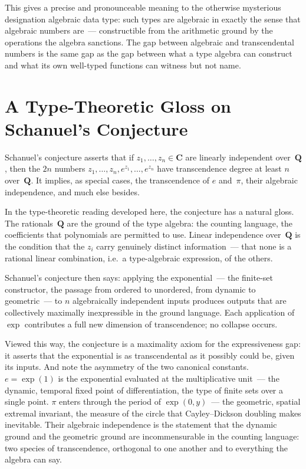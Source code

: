 This gives a precise and pronounceable meaning to the otherwise mysterious
designation {\itfont algebraic data type\/}: such types are algebraic in exactly
the sense that algebraic numbers are~--- constructible from the arithmetic ground
by the operations the algebra sanctions. The gap between algebraic and
transcendental numbers is the same gap as the gap between what a type algebra can
construct and what its own well-typed functions can witness but not name.

\section{A Type-Theoretic Gloss on Schanuel's Conjecture}

Schanuel's conjecture asserts that if $z_1, \ldots, z_n \in \mathbf{C}$ are
linearly independent over~$\mathbf{Q}$, then the $2n$ numbers
$z_1, \ldots, z_n, e^{z_1}, \ldots, e^{z_n}$ have transcendence degree at least
$n$ over~$\mathbf{Q}$. It implies, as special cases, the transcendence of $e$
and~$\pi$, their algebraic independence, and much else besides.

In the type-theoretic reading developed here, the conjecture has a natural gloss.
The rationals~$\mathbf{Q}$ are the ground of the type algebra: the counting
language, the coefficients that polynomials are permitted to use. Linear
independence over~$\mathbf{Q}$ is the condition that the $z_i$ carry genuinely
distinct information~--- that none is a rational linear combination, i.e.\ a
{\itfont type-algebraic expression\/}, of the others.

Schanuel's conjecture then says: applying the exponential~--- the finite-set
constructor, the passage from ordered to unordered, from dynamic to
geometric~--- to $n$ algebraically independent inputs produces outputs that are
collectively {\itfont maximally\/} inexpressible in the ground language. Each
application of $\exp$ contributes a full new dimension of transcendence; no
collapse occurs.

Viewed this way, the conjecture is a maximality axiom for the expressiveness gap:
it asserts that the exponential is {\itfont as transcendental as it possibly
could be\/}, given its inputs. And note the asymmetry of the two canonical
constants. $e = \exp(1)$ is the exponential evaluated at the multiplicative
unit~--- the dynamic, temporal fixed point of differentiation, the type of finite
sets over a single point. $\pi$ enters through the period of $\exp(0,y)$~--- the
geometric, spatial extremal invariant, the measure of the circle that
Cayley--Dickson doubling makes inevitable. Their algebraic independence is the
statement that the dynamic ground and the geometric ground are incommensurable
in the counting language: two species of transcendence, orthogonal to one another
and to everything the algebra can say.

